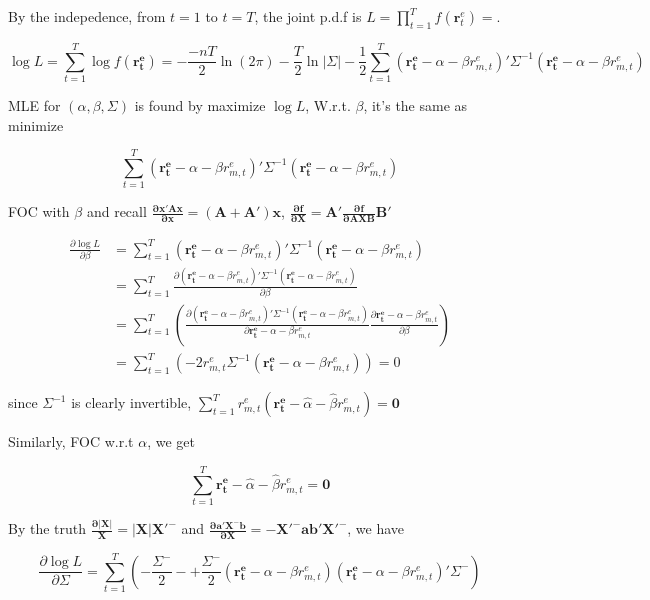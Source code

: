 \documentclass{article}
\begin{document}
By the indepedence, from \(t=1\) to \(t=T\), the joint p.d.f is
\(L=\prod_{t=1}^Tf(\mathbf{r}_t^e)=\).

\[ \log L= \sum_{t=1}^T \log f(\mathbf{r_t^e})= -\frac{-n T}{2}\ln(2\pi)-\frac{T}{2}\ln |\Sigma|-\frac{1}{2}\sum_{t=1}^T (\mathbf { r_t^e } - \alpha-\beta r_{m,t}^e)' \Sigma ^ { - 1 } ( \mathbf { r_t^e } - \alpha-\beta r_{m,t}^e) \]

MLE for \((\alpha,\beta,\Sigma)\) is found by maximize \(\log L\),
W.r.t. \(\beta\), it's the same as minimize

\[ \sum_{t=1}^T (\mathbf { r_t^e } - \alpha-\beta r_{m,t}^e)' \Sigma ^ { - 1 } ( \mathbf { r_t^e } - \alpha-\beta r_{m,t}^e) \]

FOC with \(\beta\) and recall
\(\mathbf{\frac{\partial x'Ax}{\partial x}=(A+A')x}\),
\(\mathbf{\frac{\partial f}{\partial X}=A'\frac{\partial f}{\partial AXB}B'}\)

\[ \begin{aligned}
  \frac{\partial \log L}{\partial \beta}&=\sum_{t=1}^T (\mathbf { r_t^e } - \alpha-\beta r_{m,t}^e)' \Sigma ^ { - 1 } ( \mathbf { r_t^e } - \alpha-\beta r_{m,t}^e)
  \\&=\sum_{t=1}^T \frac{\partial (\mathbf { r_t^e } - \alpha-\beta r_{m,t}^e)' \Sigma ^ { - 1 } ( \mathbf { r_t^e } - \alpha-\beta r_{m,t}^e)}{\partial \beta}
  \\&=\sum_{t=1}^T( \frac{\partial (\mathbf { r_t^e } - \alpha-\beta r_{m,t}^e)' \Sigma ^ { - 1 } ( \mathbf { r_t^e } - \alpha-\beta r_{m,t}^e)}{\partial \mathbf { r_t^e } - \alpha-\beta r_{m,t}^e} \frac{\partial \mathbf { r_t^e } - \alpha-\beta r_{m,t}^e}{\partial \beta})
  \\&=\sum_{t=1}^T( -2r_{m,t}^e\Sigma^{-1}(\mathbf { r_t^e } - \alpha-\beta r_{m,t}^e)
  )=0
\end{aligned} \]

since \(\Sigma^{-1}\) is clearly invertible,
\(\sum_{t=1}^T r_{m,t}^e(\mathbf { r_t^e } -\hat{\alpha}-\hat{\beta} r_{m,t}^e)=\mathbf{0}\)

Similarly, FOC w.r.t \(\alpha\), we get

\[\sum_{t=1}^T \mathbf { r_t^e } -\hat{\alpha}-\hat{\beta} r_{m,t}^e=\mathbf{0}  \]

By the truth \(\mathbf{\frac{\partial |X|}{X}=|X|X'^-}\) and
\(\mathbf{\frac{\partial a'X^-b}{\partial X}=-X'^-ab'X'^-}\), we have

\[ \frac{\partial \log L}{\partial \Sigma}=\sum_{t=1}^T (-\frac{\Sigma^-}{2}-+\frac{\Sigma^-}{2}(\mathbf { r_t^e } - \alpha-\beta r_{m,t}^e)(\mathbf { r_t^e } - \alpha-\beta r_{m,t}^e)'\Sigma^-) \]
\end{document}
